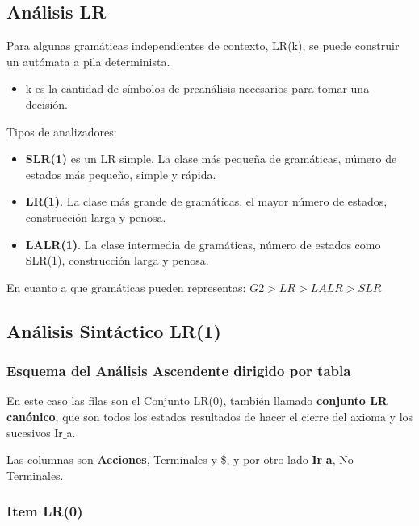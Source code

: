 \documentclass[12pt, twoside, openright]{report} %
\begin{document}
\subsection{Análisis LR}
Para algunas gramáticas independientes de contexto, LR(k), se puede construir un autómata a pila determinista.

\begin{itemize}
  \item k es la cantidad de símbolos de preanálisis necesarios para tomar una decisión.
\end{itemize}

Tipos de analizadores:
\begin{itemize}
  \item \textbf{SLR(1)} es un LR simple. La clase más pequeña de gramáticas, número de estados más pequeño, simple y rápida.
  \item \textbf{LR(1)}. La clase más grande de gramáticas, el mayor número de estados, construcción larga y penosa.
  \item \textbf{LALR(1)}. La clase intermedia de gramáticas, número de estados como SLR(1), construcción larga y penosa.
\end{itemize}
En cuanto a que gramáticas pueden representas: $G2>LR>LALR>SLR$

\begin{figure}[H]
  {\def\svgwidth{.9\textwidth}
  }
\end{figure}

\subsection{Análisis Sintáctico LR(1)}

\subsubsection{Esquema del Análisis Ascendente dirigido por tabla}
En este caso las filas son el Conjunto LR(0), también llamado \textbf{conjunto LR canónico}, que son todos los estados resultados de hacer el cierre del axioma y los sucesivos Ir$\_$a.

Las columnas son \textbf{Acciones}, Terminales y \$, y por otro lado \textbf{Ir$\_$a}, No Terminales.

\subsubsection{Item LR(0)}
\end{document}
